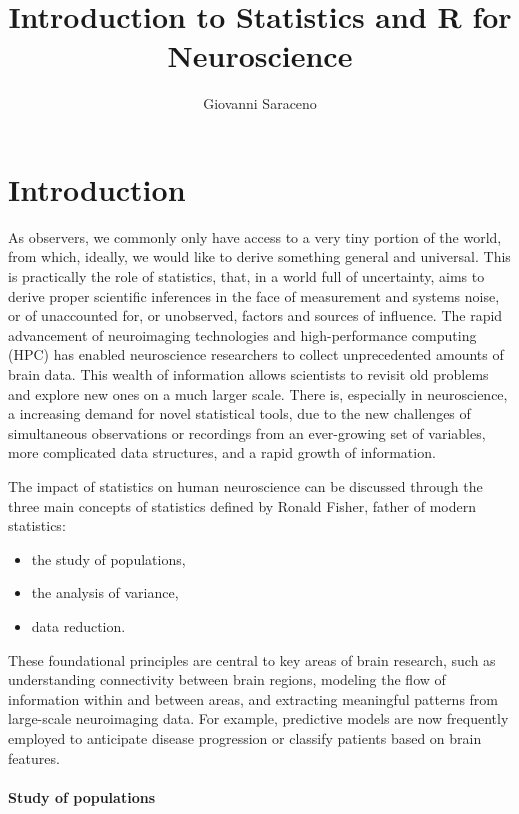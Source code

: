 \documentclass[
]{article}
\title{Introduction to Statistics and R for Neuroscience}
\author{Giovanni Saraceno}
\date{}
\providecommand{\tightlist}{%
  \setlength{\itemsep}{0pt}\setlength{\parskip}{0pt}}
\begin{document}
\maketitle

{
\setcounter{tocdepth}{2}
\tableofcontents
}
\hypertarget{introduction}{%
\section{Introduction}\label{introduction}}

As observers, we commonly only have access to a very tiny portion of the
world, from which, ideally, we would like to derive something general
and universal. This is practically the role of statistics, that, in a
world full of uncertainty, aims to derive proper scientific inferences
in the face of measurement and systems noise, or of unaccounted for, or
unobserved, factors and sources of influence. The rapid advancement of
neuroimaging technologies and high-performance computing (HPC) has
enabled neuroscience researchers to collect unprecedented amounts of
brain data. This wealth of information allows scientists to revisit old
problems and explore new ones on a much larger scale. There is,
especially in neuroscience, a increasing demand for novel statistical
tools, due to the new challenges of simultaneous observations or
recordings from an ever-growing set of variables, more complicated data
structures, and a rapid growth of information.

The impact of statistics on human neuroscience can be discussed through
the three main concepts of statistics defined by Ronald Fisher, father
of modern statistics:

\begin{itemize}
\tightlist
\item
  the study of populations,
\item
  the analysis of variance,
\item
  data reduction.
\end{itemize}

These foundational principles are central to key areas of brain
research, such as understanding connectivity between brain regions,
modeling the flow of information within and between areas, and
extracting meaningful patterns from large-scale neuroimaging data. For
example, predictive models are now frequently employed to anticipate
disease progression or classify patients based on brain features.

\hypertarget{study-of-populations}{%
\paragraph{Study of populations}\label{study-of-populations}}
\end{document}
